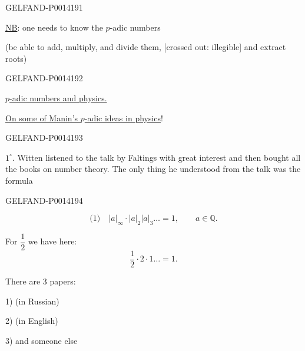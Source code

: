 \begin{GelfandAdjacentEvidence}{GELFAND-P001419}{1}


\uline{NB}: one needs to know the \(p\)-adic numbers

(be able to add, multiply, and divide them, [crossed out: illegible] and extract roots)
\end{GelfandAdjacentEvidence}
\begin{GelfandAdjacentEvidence}{GELFAND-P001419}{2}


\qquad \uline{\(p\)-adic numbers and physics.}

\uline{On some of Manin’s \(p\)-adic ideas in physics}!
\end{GelfandAdjacentEvidence}
\begin{GelfandAdjacentEvidence}{GELFAND-P001419}{3}


\(1^{\circ}\). Witten listened to the talk by Faltings with great interest and then bought all the books on number theory.
The only thing he understood from the talk was the formula
\end{GelfandAdjacentEvidence}
\begin{GelfandAdjacentEvidence}{GELFAND-P001419}{4}

\[
\text{(1)}\quad |a|_\infty\cdot|a|_2|a|_3\ldots=1,\qquad a\in\mathbb Q.
\]

For \(\dfrac12\) we have here:
\[
\frac12\cdot 2\cdot 1\ldots=1.
\]

There are 3 papers:

1) \qquad (in Russian)

2) \qquad (in English)

3)  and someone else
\end{GelfandAdjacentEvidence}
